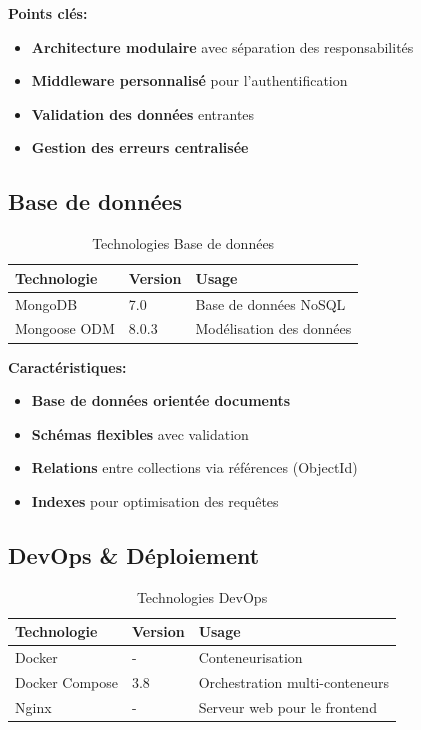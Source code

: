 \documentclass[12pt,a4paper]{article}
\begin{document}
\textbf{Points clés:}
\begin{itemize}
    \item \textbf{Architecture modulaire} avec séparation des responsabilités
    \item \textbf{Middleware personnalisé} pour l'authentification
    \item \textbf{Validation des données} entrantes
    \item \textbf{Gestion des erreurs centralisée}
\end{itemize}

\subsection{Base de données}

\begin{table}[h]
\centering
\begin{tabular}{|l|l|p{6cm}|}
\hline
\textbf{Technologie} & \textbf{Version} & \textbf{Usage} \\
\hline
MongoDB & 7.0 & Base de données NoSQL \\
Mongoose ODM & 8.0.3 & Modélisation des données \\
\hline
\end{tabular}
\caption{Technologies Base de données}
\end{table}

\textbf{Caractéristiques:}
\begin{itemize}
    \item \textbf{Base de données orientée documents}
    \item \textbf{Schémas flexibles} avec validation
    \item \textbf{Relations} entre collections via références (ObjectId)
    \item \textbf{Indexes} pour optimisation des requêtes
\end{itemize}

\subsection{DevOps \& Déploiement}

\begin{table}[h]
\centering
\begin{tabular}{|l|l|p{6cm}|}
\hline
\textbf{Technologie} & \textbf{Version} & \textbf{Usage} \\
\hline
Docker & - & Conteneurisation \\
Docker Compose & 3.8 & Orchestration multi-conteneurs \\
Nginx & - & Serveur web pour le frontend \\
\hline
\end{tabular}
\caption{Technologies DevOps}
\end{table}
\end{document}

